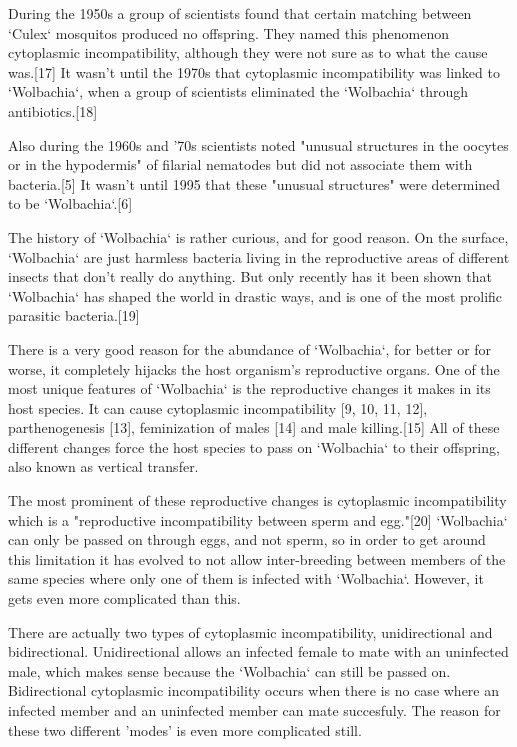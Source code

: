 \documentclass[twocolumn]{article}
\begin{document}
During the 1950s a group of scientists found that certain matching between `Culex` mosquitos produced no offspring. They named this phenomenon cytoplasmic incompatibility, although they were not sure as to what the cause was.[17] It wasn't until the 1970s that cytoplasmic incompatibility was linked to `Wolbachia`, when a group of scientists eliminated the `Wolbachia` through antibiotics.[18]

Also during the 1960s and '70s scientists noted "unusual structures in the oocytes or in the hypodermis" of filarial nematodes but did not associate them with bacteria.[5] It wasn't until 1995 that these "unusual structures" were determined to be `Wolbachia`.[6]

The history of `Wolbachia` is rather curious, and for good reason. On the surface, `Wolbachia` are just harmless bacteria living in the reproductive areas of different insects that don't really do anything. But only recently has it been shown that `Wolbachia` has shaped the world in drastic ways, and is one of the most prolific parasitic bacteria.[19]

There is a very good reason for the abundance of `Wolbachia`, for better or for worse, it completely hijacks the host organism's reproductive organs. One of the most unique features of `Wolbachia` is the reproductive changes it makes in its host species. It can cause cytoplasmic incompatibility [9, 10, 11, 12], parthenogenesis [13], feminization of males [14] and male killing.[15] All of these different changes force the host species to pass on `Wolbachia` to their offspring, also known as vertical transfer.

The most prominent of these reproductive changes is cytoplasmic incompatibility which is a "reproductive incompatibility between sperm and egg."[20] `Wolbachia` can only be passed on through eggs, and not sperm, so in order to get around this limitation it has evolved to not allow inter-breeding between members of the same species where only one of them is infected with `Wolbachia`. However, it gets even more complicated than this.

There are actually two types of cytoplasmic incompatibility, unidirectional and bidirectional. Unidirectional allows an infected female to mate with an uninfected male, which makes sense because the `Wolbachia` can still be passed on. Bidirectional cytoplasmic incompatibility occurs when there is no case where an infected member and an uninfected member can mate succesfuly. The reason for these two different 'modes' is even more complicated still.
\end{document}
